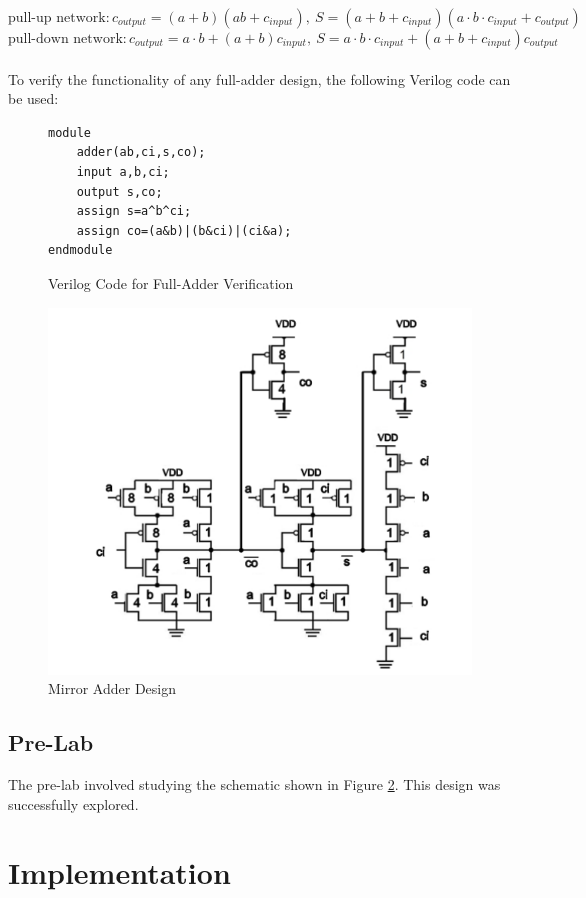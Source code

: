 \documentclass[12pt]{article}
\begin{document}
$$\textrm{pull-up network}:c_{output}=(a+b)(ab+c_{input}),\ S=(a+b+c_{input})(a\cdot b \cdot c_{input}+c_{output})$$
$$\textrm{pull-down network}: c_{output}=a \cdot b+(a+b)c_{input},\ S=a\cdot b\cdot c_{input}+(a+b+c_{input})c_{output}$$
\\
\noindent To verify the functionality of any full-adder design, the following Verilog code can be used:
\begin{figure}[H]
\begin{lstlisting}
module 
	adder(ab,ci,s,co);
	input a,b,ci;
	output s,co;
	assign s=a^b^ci;
	assign co=(a&b)|(b&ci)|(ci&a);
endmodule
\end{lstlisting}
\caption{Verilog Code for Full-Adder Verification}
\label{fig:verilog}
\end{figure}
\begin{figure}[H]
\centering
\includegraphics[width=0.7\linewidth]{mirror-pre}
\caption{Mirror Adder Design}
\label{fig:mirror-pre}
\end{figure}
\subsection{Pre-Lab}
The pre-lab involved studying the schematic shown in Figure \ref{fig:mirror-pre}. This design was successfully explored.
\section{Implementation}
\end{document}
